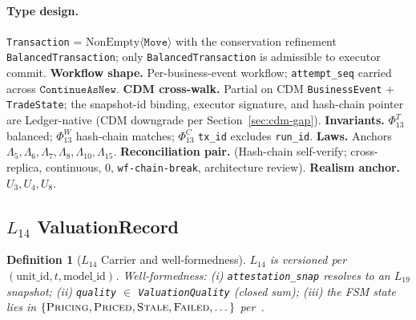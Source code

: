\documentclass[11pt,a4paper]{article}
\newtheorem{definition}{Definition}[section]
\begin{document}
\paragraph{Type design.} \texttt{Transaction} = $\mathrm{NonEmpty}\langle\texttt{Move}\rangle$ with the conservation refinement \texttt{BalancedTransaction}; only \texttt{BalancedTransaction} is admissible to executor commit. \textbf{Workflow shape.} Per-business-event workflow; \texttt{attempt\_seq} carried across $\texttt{ContinueAsNew}$. \textbf{CDM cross-walk.} Partial on CDM \texttt{BusinessEvent} + \texttt{TradeState}; the snapshot-id binding, executor signature, and hash-chain pointer are Ledger-native (CDM downgrade per Section~\ref{sec:cdm-gap}). \textbf{Invariants.} $\Phi_{13}^T$ balanced; $\Phi_{13}^W$ hash-chain matches; $\Phi_{13}^C$ \texttt{tx\_id} excludes \texttt{run\_id}. \textbf{Laws.} Anchors $\Lambda_5, \Lambda_6, \Lambda_7, \Lambda_8, \Lambda_{10}, \Lambda_{15}$. \textbf{Reconciliation pair.} (Hash-chain self-verify; cross-replica, continuous, 0, \texttt{wf-chain-break}, architecture review). \textbf{Realism anchor.} $U_3, U_4, U_8$.

\subsection{$L_{14}$ ValuationRecord}
\label{sec:leaf-l14}

\begin{definition}[$L_{14}$ Carrier and well-formedness]
$L_{14}$ is versioned per $(\text{unit\_id}, t, \text{model\_id})$. Well-formedness: (i) \texttt{attestation\_snap} resolves to an $L_{19}$ snapshot; (ii) \texttt{quality} $\in$ \texttt{ValuationQuality} (closed sum); (iii) the FSM state lies in $\{\textsc{Pricing}, \textsc{Priced}, \textsc{Stale}, \textsc{Failed},\dots\}$ per~\cite[\S2]{valuation}.
\end{definition}
\end{document}
